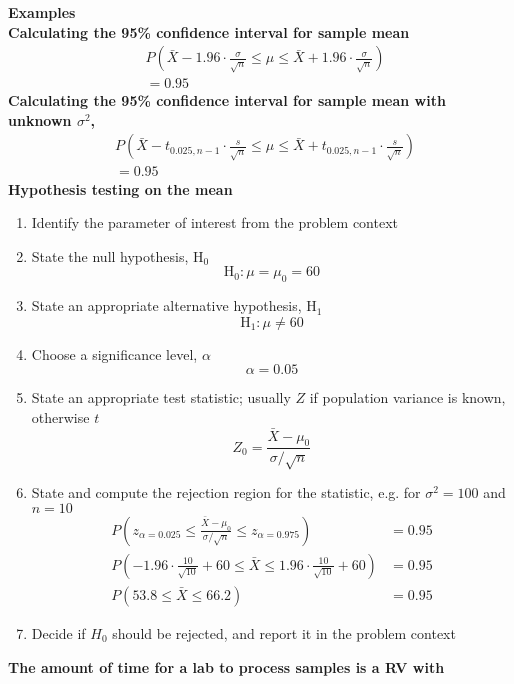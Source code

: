 \documentclass[a4paper]{article}
\newcommand{\heading}[1]{{\small\textbf{#1}}}
\newcommand{\subheading}[1]{{\scriptsize\textbf{#1}}}
\begin{document}
\begin{multicols*}{4}
\heading{Examples} \\
\subheading{Calculating the 95\% confidence interval for sample mean}
\begin{align*}
&P \left (
    \bar{X} - 1.96 \cdot \frac{\sigma}{\sqrt{n}} \leq
    \mu \leq
    \bar{X} + 1.96 \cdot \frac{\sigma}{\sqrt{n}}
    \right ) \\ 
&= 0.95
\end{align*}
\subheading{Calculating the 95\% confidence interval for sample mean 
with unknown $\sigma^2$,}
\begin{align*}
&P \left (
    \bar{X} - t_{0.025, n-1} \cdot \frac{s}{\sqrt{n}} \leq
    \mu \leq
    \bar{X} + t_{0.025, n-1} \cdot \frac{s}{\sqrt{n}}
    \right ) \\ 
&= 0.95
\end{align*}
\subheading{Hypothesis testing on the mean}
\begin{enumerate} \itemsep -0.5em
    \item Identify the parameter of interest from the problem context
    \item State the null hypothesis, $\mathrm{H}_0$
        $$\mathrm{H}_0: \mu = \mu_0 = 60$$
    \item State an appropriate alternative hypothesis, $\mathrm{H}_1$
        $$\mathrm{H}_1: \mu \neq 60$$
    \item Choose a significance level, $\alpha$
        $$\alpha = 0.05$$
    \item State an appropriate test statistic; usually $Z$ if population
        variance is known, otherwise $t$
        $$Z_0 = \frac{\bar{X}-\mu_0}{\sigma/\sqrt{n}}$$
    \item State and compute the rejection region for the statistic, 
        e.g. for $\sigma^2 = 100$ and $n = 10$
        \begin{align*}
            P(z_{\alpha=0.025} \leq
                \frac{\bar{X}-\mu_0}{\sigma/\sqrt{n}} \leq
                z_{\alpha=0.975}) &= 0.95 \\
            P(-1.96 \cdot \frac{10}{\sqrt{10}} + 60 \leq
                \bar{X} \leq
                1.96 \cdot \frac{10}{\sqrt{10}} + 60) &= 0.95 \\
            P(53.8 \leq \bar{X} \leq 66.2) &= 0.95
        \end{align*}
    \item Decide if $H_0$ should be rejected, and report it in the
        problem context
\end{enumerate}
\subheading{The amount of time for a lab to process samples is a RV with
}
\end{multicols*}
\end{document}
